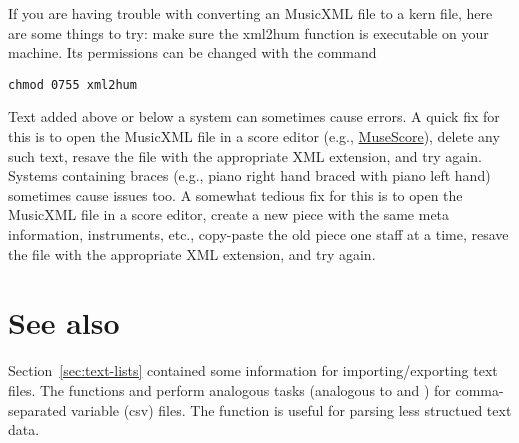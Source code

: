 If you are having trouble with converting an MusicXML file to a kern file, here are some things to try: make sure the xml2hum function is executable on your
machine. Its permissions can be changed with the command
\begin{verbatim}
chmod 0755 xml2hum
\end{verbatim}
\noindent Text added above or below a system can sometimes cause errors. A quick fix for this is to open the MusicXML file in a score editor (e.g., \href{http://musescore.org/}{MuseScore}), delete any such text, resave the file with the appropriate XML extension, and try again. Systems containing braces (e.g., piano right hand braced with piano left hand) sometimes cause issues too. A somewhat tedious fix for this is to open the MusicXML file in a score editor, create a new piece with the same meta information, instruments, etc., copy-paste the old piece one staff at a time, resave the file with the appropriate XML extension, and try again.

\section{See also}\label{sec:porting-other-file-types}

Section~\ref{sec:text-lists} contained some information for importing/exporting text files. The functions  and  perform analogous tasks (analogous to  and ) for comma-separated variable (csv) files. The function  is useful for parsing less structued text data.

